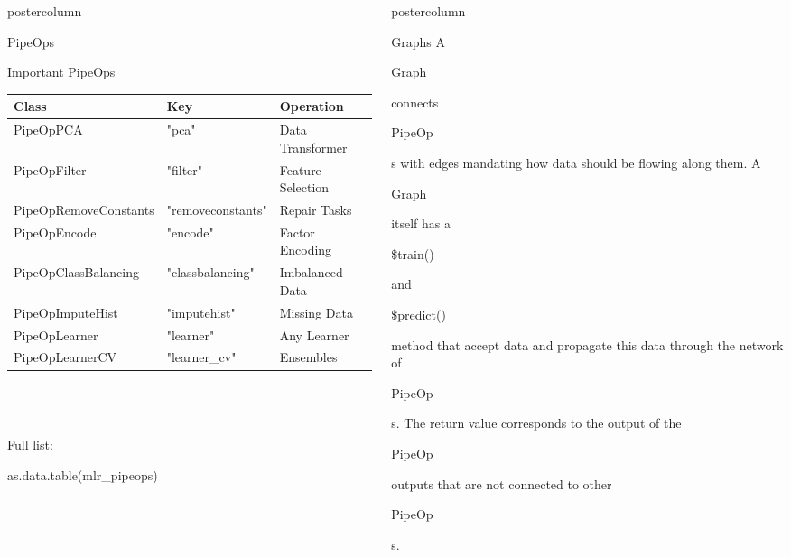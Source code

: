 \documentclass{beamer}
\newlength{\columnheight} %
\newcommand{\codeinline}[1]{\begin{codeboxinline}#1\end{codeboxinline}}
\begin{document}
\begin{frame}[fragile]{}
\begin{columns}
\begin{column}{.245\textwidth}
\begin{beamercolorbox}[center]{postercolumn}
\begin{minipage}{.98\textwidth}
{\begin{myblock}{PipeOps}
\begin{itemize}
              \end{itemize}
  			\end{myblock}
            \begin{myblock}{Important PipeOps}
              \begin{footnotesize}
                \begin{centering}
                  \begin{tabular}{l l l}
                    \textbf{Class} & \textbf{Key} & \textbf{Operation} \\ \hline
                    PipeOpPCA & "pca" & Data Transformer\\
                    PipeOpFilter & "filter" & Feature Selection\\
                    PipeOpRemoveConstants & "removeconstants" & Repair Tasks\\
                    PipeOpEncode & "encode" & Factor Encoding\\
                    PipeOpClassBalancing & "classbalancing" & Imbalanced Data\\
                    PipeOpImputeHist & "imputehist" & Missing Data\\
                    PipeOpLearner & "learner" & Any Learner\\
                    PipeOpLearnerCV & "learner\_cv" & Ensembles\\ \hline
                  \end{tabular}
                \end{centering}
              \end{footnotesize}
              \ \\
              \ \\
              \ \\
              Full list: \codeinline{as.data.table(mlr\_pipeops)}
						\end{myblock}
						\vfill}
				\end{minipage}
			\end{beamercolorbox}
		\end{column}
		\begin{column}{.245\textwidth}
			\begin{beamercolorbox}[center]{postercolumn}
				\begin{minipage}{.98\textwidth}
					\parbox[t][\columnheight]{\textwidth}{
						\begin{myblock}{Graphs}
              A \codeinline{Graph} connects \codeinline{PipeOp}s with edges mandating how data should be flowing along them. A \codeinline{Graph} itself has a \codeinline{\$train()} and \codeinline{\$predict()} method that accept data and propagate this data through the network of \codeinline{PipeOp}s. The return value corresponds to the output of the \codeinline{PipeOp} outputs that are not connected to other \codeinline{PipeOp}s.\\

\end{myblock}}
\end{minipage}
\end{beamercolorbox}
\end{column}
\end{columns}
\end{frame}
\end{document}
